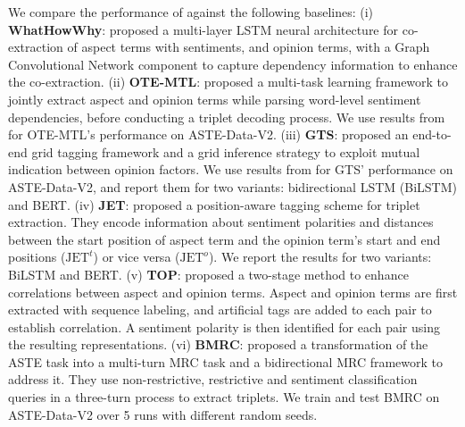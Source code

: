 \documentclass[sigconf]{acmart}
\begin{document}
We compare the performance of \mymodel{} against the following baselines: (i) \textbf{WhatHowWhy}: \citet{peng2020knowing} proposed a multi-layer LSTM neural architecture for co-extraction of aspect terms with sentiments, and opinion terms, with a Graph Convolutional Network \cite{kipf2016semi} component to capture dependency information to enhance the co-extraction. (ii) \textbf{OTE-MTL}: \citet{zhang2020multi} proposed a multi-task learning framework to jointly extract aspect and opinion terms while parsing word-level sentiment dependencies, before conducting a triplet decoding process. We use results from \citet{huang2021first} for OTE-MTL's performance on ASTE-Data-V2. (iii) \textbf{GTS}: \citet{wu2020grid} proposed an end-to-end grid tagging framework and a grid inference strategy to exploit mutual indication between opinion factors. We use results from \citet{huang2021first} for GTS' performance on ASTE-Data-V2, and report them for two variants: bidirectional LSTM (BiLSTM) and BERT. (iv) \textbf{JET}: \citet{xu2020position} proposed a position-aware tagging scheme for triplet extraction. They encode information about sentiment polarities and distances between the start position of aspect term and the opinion term's start and end positions ($\mathrm{JET}^{t}$) or vice versa ($\mathrm{JET}^{o}$). We report the results for two variants: BiLSTM and BERT. (v) \textbf{TOP}: \citet{huang2021first} proposed a two-stage method to enhance correlations between aspect and opinion terms. Aspect and opinion terms are first extracted with sequence labeling, and artificial tags are added to each pair to establish correlation. A sentiment polarity is then identified for each pair using the resulting representations. (vi) \textbf{BMRC}: \citet{chen2021bidirectional} proposed a transformation of the ASTE task into a multi-turn MRC task and a bidirectional MRC framework to address it. They use non-restrictive, restrictive and sentiment classification queries in a three-turn process to extract triplets. We train and test BMRC on ASTE-Data-V2 over 5 runs with different random seeds.
\end{document}
